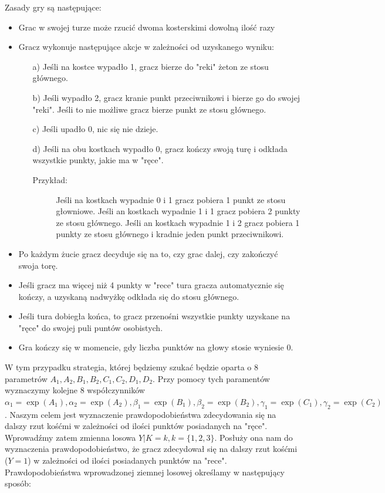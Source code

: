 \documentclass[inzynierska]{pwr_wmat_praca_dyplomowa}
\theoremstyle{plain}
\numberwithin{theorem}{chapter}
\theoremstyle{definition}
\numberwithin{theorem}{chapter}
\begin{document}
	Zasady gry są następujące:
	\begin{itemize}[]
		\item Grac w swojej turze może rzucić dwoma kosterskimi dowolną ilość razy
		\item  Gracz wykonuje następujące akcje w zależności od uzyskanego wyniku:
		\begin{enumerate}
			\item[a)] Jeśli na kostce wypadło 1, gracz bierze do "reki" żeton ze stosu głównego.
			\item[b)] Jeśli wypadło 2, gracz kranie punkt przeciwnikowi i bierze go do swojej "reki". Jeśli to nie możliwe gracz bierze punkt ze stosu głównego. 
			\item[c)] Jeśli upadło 0, nic się nie dzieje.
			\item[d)] Jeśli na obu kostkach wypadło 0, gracz kończy swoją turę i odkłada wszystkie punkty, jakie ma w "ręce".
			\begin{description}
				\item[Przykład:] Jeśli na kostkach wypadnie 0 i 1 gracz pobiera 1 punkt ze stosu głowniowe. Jeśli an kostkach wypadnie 1 i 1 gracz pobiera 2 punkty ze stosu głównego. Jeśli an kostkach wypadnie 1 i 2 gracz pobiera 1 punkty ze stosu głównego i kradnie jeden punkt przeciwnikowi. 
			\end{description}		
		\end{enumerate}
		\item Po każdym żucie gracz decyduje się na to, czy grac dalej, czy zakończyć swoja torę.
		
		\item Jeśli gracz ma więcej niż 4 punkty w "rece" tura gracza automatycznie się kończy, a uzyskaną nadwyżkę odkłada się do stosu głównego.
		
		\item Jeśli tura dobiegła końca, to gracz przenośni wszystkie punkty uzyskane na "ręce" do swojej puli puntów osobistych.
		
		\item Gra kończy się w momencie, gdy liczba punktów na głowy stosie wyniesie 0.
	\end{itemize}
	W tym przypadku strategia, której będziemy szukać będzie oparta o 8 parametrów $A_1, A_2, B_1, B_2, C_1, C_2, D_1, D_2$. Przy pomocy tych paramentów wyznaczymy kolejne 8 współczynników 
	$
	\alpha_1 = \exp(A_1),
	\alpha_2 = \exp(A_2), 
	\beta_1= \exp(B_1), 
	\beta_2= \exp(B_2), 
	\gamma_1= \exp(C_1), 
	\gamma_2= \exp(C_2)$. 
	Naszym celem jest wyznaczenie prawdopodobieństwa zdecydowania się na dalszy rzut kośćmi w zależności od ilości punktów posiadanych na "ręce". Wprowadźmy zatem  zmienna losowa $Y|K=k, k=\{1, 2, 3\}$. Posłuży ona  nam do wyznaczenia prawdopodobieństwo, że gracz zdecydował się na dalszy rzut kośćmi ($Y=1$) w zależności od ilości posiadanych punktów na "rece".  Prawdopodobieństwa wprowadzonej ziemnej losowej określamy w następujący sposób:  
\end{document}
